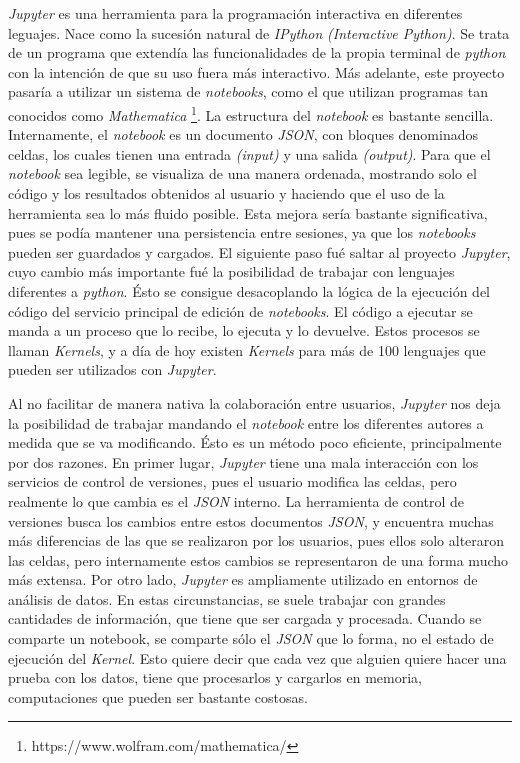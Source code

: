 \documentclass[11pt,spanish,listoffigures,listoftables]{tfgetsinf}
\begin{document}
\textit{Jupyter } es una herramienta para la programación interactiva en diferentes leguajes. Nace como la sucesión natural de \textit{IPython} \textit{(Interactive Python)}. Se trata de un programa que extendía las funcionalidades de la propia terminal de \textit{\gls{python}} con la intención de que su uso fuera más interactivo. Más adelante, este proyecto pasaría a utilizar un sistema de \textit{notebooks}, como el que utilizan programas tan conocidos como \textit{Mathematica} \footnote{https://www.wolfram.com/mathematica/}. La estructura del \textit{notebook} es bastante sencilla. Internamente, el \textit{notebook} es un documento \textit{\gls{JSON}}, con bloques denominados celdas, los cuales tienen una entrada \textit{(input)} y una salida \textit{(output)}. Para que el \textit{notebook} sea legible, se visualiza de una manera ordenada, mostrando solo el código y los resultados obtenidos al usuario y haciendo que el uso de la herramienta sea lo más fluido posible.   
Esta mejora sería bastante significativa, pues se podía mantener una persistencia entre sesiones, ya que los \textit{notebooks} pueden ser guardados y cargados. El siguiente paso fué saltar al proyecto \textit{Jupyter}, cuyo cambio más importante fué la posibilidad de trabajar con lenguajes diferentes a \textit{python}. Ésto se consigue desacoplando la lógica de la ejecución del código del servicio principal de edición de \textit{notebooks}. El código a ejecutar se manda a un proceso que lo recibe, lo ejecuta y lo devuelve. Estos procesos se llaman \textit{Kernels}, y a día de hoy existen \textit{Kernels} para más de 100 lenguajes que pueden ser utilizados con \textit{Jupyter}.

Al no facilitar de manera nativa la colaboración entre usuarios, \textit{Jupyter} nos deja la posibilidad de trabajar mandando el \textit{notebook} entre los diferentes autores a medida que se va modificando. Ésto es un método poco eficiente, principalmente por dos razones. En primer lugar, \textit{Jupyter} tiene una mala interacción con los servicios de control de versiones, pues el usuario modifica las celdas, pero realmente lo que cambia es el \textit{JSON} interno. La herramienta de control de versiones busca los cambios entre estos documentos \textit{JSON}, y encuentra muchas más diferencias de las que se realizaron por los usuarios, pues ellos solo alteraron las celdas, pero internamente estos cambios se representaron de una forma mucho más extensa.
Por otro lado, \textit{Jupyter} es ampliamente utilizado en entornos de análisis de datos. En estas circunstancias, se suele trabajar con grandes cantidades de información, que tiene que ser cargada y procesada. Cuando se comparte un notebook, se comparte sólo el \textit{JSON} que lo forma, no el estado de ejecución del \textit{Kernel}. Esto quiere decir que cada vez que alguien quiere hacer una prueba con los datos, tiene que procesarlos y cargarlos en memoria, computaciones que pueden ser bastante costosas.
\end{document}
